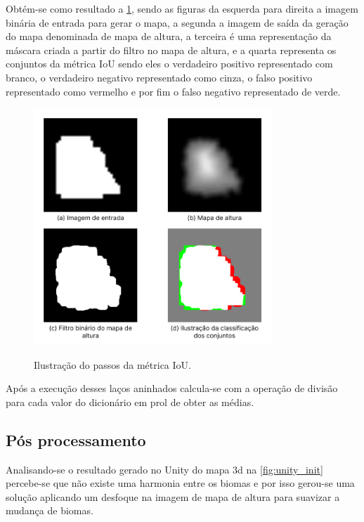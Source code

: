 Obtém-se como resultado a \cref{fig:resultado_iou}, sendo as figuras da esquerda para direita a imagem binária de entrada para gerar o mapa, a segunda a imagem de saída da geração do mapa denominada de mapa de altura, a terceira é uma representação da máscara criada a partir do filtro no mapa de altura, e a quarta representa os conjuntos da métrica IoU sendo eles o verdadeiro positivo representado com branco, o verdadeiro negativo representado como cinza, o falso positivo representado como vermelho e por fim o falso negativo representado de verde.

\begin{figure}[!ht]
	\centering
    \caption{Ilustração do passos da métrica IoU.}
	\includegraphics[width=0.8\textwidth]{figures/passos_iou.png}
	\label{fig:resultado_iou}
\end{figure}

Após a execução desses laços aninhados calcula-se com a operação de divisão para cada valor do dicionário em prol de obter as médias.

\subsection{Pós processamento}
Analisando-se o resultado gerado no Unity do mapa 3d na \cref{fig:unity_init} percebe-se que não existe uma harmonia entre os biomas e por isso gerou-se uma solução aplicando um desfoque na imagem de mapa de altura para suavizar a mudança de biomas.

